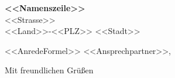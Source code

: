 \documentclass[DIN, pagenumber=false, parskip=half,fromalign=left, fromphone=true,fromemail=true,fromurl=false,fromrule=false,backaddress=off,11pt]{scrlttr2}
\begin{document}
\begin{letter}{	\textbf{<<Namenszeile>>}\\
						<<Strasse>>\\
						<<Land>>-<<PLZ>> <<Stadt>>}

\enlargethispage{5cm}
\opening{<<AnredeFormel>> <<Ansprechpartner>>,}

\closing{Mit freundlichen Grüßen}

\end{letter}
\end{document}
